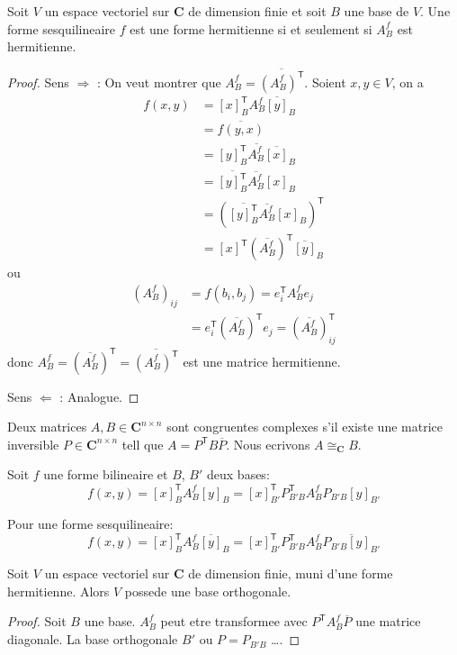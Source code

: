 \begin{lemma}
Soit $V$ un espace vectoriel sur $\mathbf{C}$ de dimension finie et soit $B$ une base de $V$. Une forme sesquilineaire $f$ est une forme hermitienne si et seulement si $A_{B}^{f}$ est hermitienne.
\end{lemma}
\begin{proof}
Sens $\Rightarrow$ : On veut montrer que $A_{B}^{f}=\overline{(A_{B}^{f})^{\mathsf{T}}}$. Soient $x,y\in V$, on a 
\begin{align*}
f(x,y) & =[x]_{B}^{\mathsf{T}}A_{B}^{f}\overline{[y]}_{B}\\
 & = \overline{f(y,x)}\\
 & =\overline{[y]_{B}^{\mathsf{T}}A_{B}^{f} \overline{[x]}_{B}} \\
 & =\overline{[y]^{\mathsf{T}}_{B}}\overline{A_{B}^{f}}[x]_{B} \\
 & =(\overline{[y]_{B}^{\mathsf{T}}}\overline{A_{B}^{f}}[x]_{B})^{\mathsf{T}} \\
 & =[x]^{\mathsf{T}}(\overline{A_{B}^{f}})^{\mathsf{T}}\overline{[y]}_{B}
\end{align*}
ou 
\begin{align*}
(A_{B}^{f})_{ij} & =f(b_{i},b_{j})=e_{i}^{\mathsf{T}}A_{B}^{f}e_{j} \\
 & =e_{i}^{\mathsf{T}}(\overline{A_{B}^{f}})^{\mathsf{T}}e_{j}=(\overline{A_{B}^{f}})^{\mathsf{T}}_{ij}
\end{align*}
donc $A_{B}^{f}=(\overline{A_{B}^{f}})^{\mathsf{T}}=\overline{(A_{B}^{f})^{\mathsf{T}}}$ est une matrice hermitienne.

Sens $\Leftarrow$ : Analogue.
\end{proof}
\begin{definition}
Deux matrices $A,B\in \mathbf{C}^{n\times n}$ sont congruentes complexes s'il existe une matrice inversible $P\in \mathbf{C}^{n\times n}$ tell que $A=P^{\mathsf{T}}B \overline{P}$. Nous ecrivons $A\cong_{\mathbf{C}}B$.
\end{definition}
\begin{reminder}
Soit $f$ une forme bilineaire et $B$, $B'$ deux bases:
$$
f(x,y)=[x]_{B}^{\mathsf{T}}A_{B}^{f}[y]_{B}=[x]_{B'}^{\mathsf{T}}P_{B'B}^{\mathsf{T}}A_{B}^{f}P_{B'B}[y]_{B'}
$$

Pour une forme sesquilineaire:
$$
f(x,y)=[x]_{B}^{\mathsf{T}}A_{B}^{f}\overline{[y]}_{B}=[x]_{B'}^{\mathsf{T}}P_{B'B}^{\mathsf{T}}A_{B}^{f}\overline{P_{B'B}[y]_{B'}}
$$
\end{reminder}
\begin{theorem}
Soit $V$ un espace vectoriel sur $\mathbf{C}$ de dimension finie, muni d'une forme hermitienne. Alors $V$ possede une base orthogonale.
\end{theorem}
\begin{proof}
Soit $B$ une base. $A_{B}^{f}$ peut etre transformee avec $P^{\mathsf{T}}A_{B}^{f}\overline{P}$ une matrice diagonale. La base orthogonale $B'$ ou $P=P_{B'B}$ \dots.
\end{proof}

